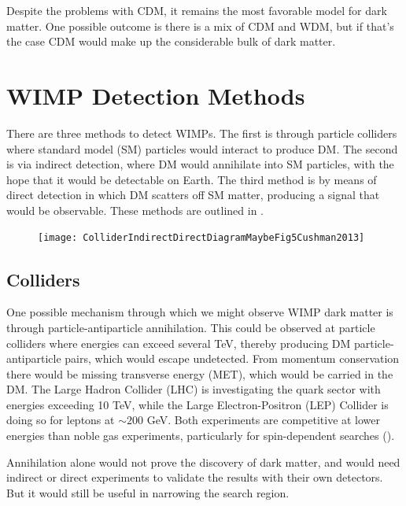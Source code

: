 Despite the problems with CDM, it remains the most favorable model for dark matter.  One possible outcome is
there is a mix of CDM and WDM, but if that's the case CDM would make up the considerable bulk of dark matter.


\section[WIMP Detection Methods][WIMP Detection Methods]{WIMP Detection Methods}
\label{sec:detection}

There are three methods to detect WIMPs.  The first is through particle colliders where standard model (SM) particles would interact to
produce DM.  The second is via indirect detection, where DM would annihilate into SM particles, with the hope that it would be detectable
on Earth.  The third method is by means of direct detection in which DM scatters off SM matter, producing a signal that would be
observable.  These methods are outlined in .

\begin{figure}
\centering
\texttt{[image: ColliderIndirectDirectDiagramMaybeFig5Cushman2013]}
\label{fig:detection_methods}
\end{figure}

\subsection{Colliders} \label{subsec:colliders}
One possible mechanism through which we might observe WIMP dark matter is through particle-antiparticle
annihilation.  This could be observed at particle colliders where energies can exceed
several TeV, thereby producing DM particle-antiparticle pairs, which
would escape undetected.  From momentum conservation there would be missing transverse energy (MET),
which would be carried in the DM.  The Large Hadron Collider (LHC) is investigating the quark sector with energies
exceeding 10 TeV, while the Large Electron-Positron (LEP) Collider is doing so for leptons at
$\sim 200$ GeV.  Both experiments are competitive at lower energies than noble gas experiments, particularly
for spin-dependent searches ().

Annihilation alone would not prove the discovery of dark matter, and would need
indirect or direct experiments to validate the results with their own detectors.  But
it would still be useful in narrowing the search region.

